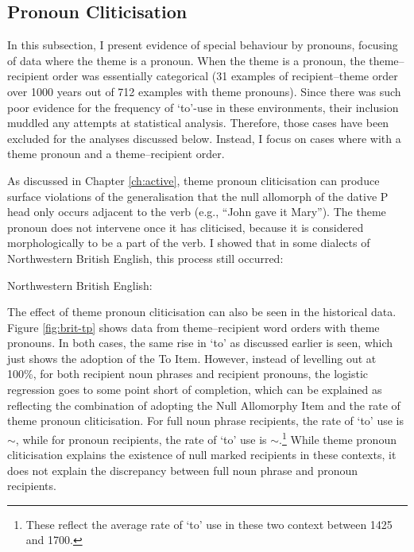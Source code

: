 	\subsection{Pronoun Cliticisation}\label{sec:act-tp}
	In this subsection, I present evidence of special behaviour by pronouns, focusing of data where the theme is a pronoun. When the theme is a pronoun, the theme--recipient order was essentially categorical (31 examples of recipient--theme order over 1000 years out of 712 examples with theme pronouns). Since there was such poor evidence for the frequency of `to'-use in these environments, their inclusion muddled any attempts at statistical analysis. Therefore, those cases have been excluded for the analyses discussed below. Instead, I focus on cases where with a theme pronoun and a theme--recipient order.

	As discussed in Chapter \ref{ch:active}, theme pronoun cliticisation can produce surface violations of the generalisation that the null allomorph of the dative P head only occurs adjacent to the verb (e.g., ``John gave it Mary''). The theme pronoun does not intervene once it has cliticised, because it is considered morphologically to be a part of the verb. I showed that in some dialects of Northwestern British English, this process still occurred:

	\begin{exe}
		 Northwestern British English:
		\begin{xlist}
	\end{xlist}
	\end{exe}

	The effect of theme pronoun cliticisation can also be seen in the historical data. Figure \ref{fig:brit-tp} shows data from theme--recipient word orders with theme pronouns. In both cases, the same rise in `to' as discussed earlier is seen, which just shows the adoption of the To Item. However, instead of levelling out at 100\%, for both recipient noun phrases and recipient pronouns, the logistic regression goes to some point short of completion, which can be explained as reflecting the combination of adopting the Null Allomorphy Item and the rate of theme pronoun cliticisation. For full noun phrase recipients, the rate of `to' use is $\sim$, while for pronoun recipients, the rate of `to' use is $\sim$.\footnote{These reflect the average rate of `to' use in these two context between 1425 and 1700.} While theme pronoun cliticisation explains the existence of null marked recipients in these contexts, it does not explain the discrepancy between full noun phrase and pronoun recipients.

